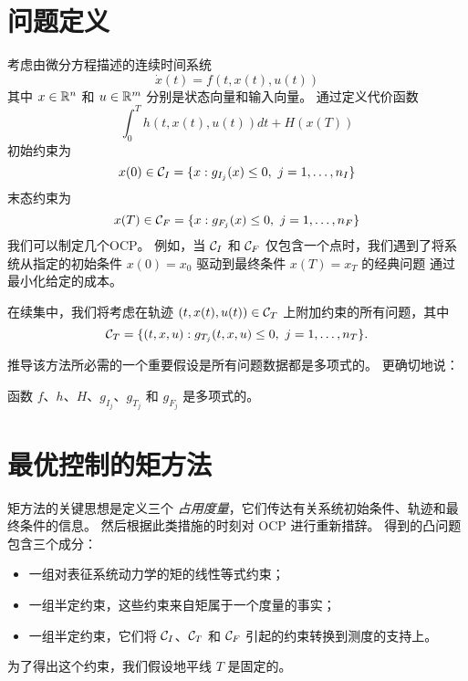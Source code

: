 \begin{translation}
\section{问题定义}
考虑由微分方程描述的连续时间系统
\begin{equation}\label{eq:dynamics}
\dot x(t) = f(t, x(t), u(t))
\end{equation}
其中 $x\in\mathbb{R}^n$ 和 $u\in\mathbb{R}^m$ 分别是状态向量和输入向量。
通过定义代价函数
\begin{equation}\label{eq:cost}
\int_0^T h(t, x(t), u(t)) dt + H(x(T))
\end{equation}
初始约束为
\begin{equation}\nonumber
x(0) \in {\cal{C}}_I=\{ x: g_{I_j}(x)\leq 0, ~ j=1,\dots,n_I \} 
\end{equation}
末态约束为
\begin{equation}\nonumber
x(T) \in {\cal{C}}_F=\{ x: g_{F_j}(x)\leq 0, ~ j=1,\dots,n_F \}
\end{equation}
我们可以制定几个OCP。 例如，当 ${\cal{C}}_I$ 和 ${\cal{C}}_F$ 仅包含一个点时，我们遇到了将系统从指定的初始条件 $x(0)=x_0$ 驱动到最终条件 $x(T)=x_T$ 的经典问题 通过最小化给定的成本。

在续集中，我们将考虑在轨迹 $(t, x(t), u(t)) \in {\cal{C}}_T$ 上附加约束的所有问题，其中
\begin{equation}\nonumber
{\cal{C}}_T=\{ (t,x,u): g_{T_j}(t,x,u)\leq 0, ~ j=1,\dots,n_T \}.
\end{equation}

推导该方法所必需的一个重要假设是所有问题数据都是多项式的。 更确切地说：
\begin{assumption}\label{as:poly}
  函数 $f$、$h$、$H$、$g_{I_j}$、$g_{T_j}$ 和 $g_{F_j}$ 是多项式的。
\end{assumption}

\section{最优控制的矩方法}
矩方法的关键思想是定义三个 \textit{占用度量}，它们传达有关系统初始条件、轨迹和最终条件的信息。
然后根据此类措施的时刻对 OCP 进行重新措辞。
得到的凸问题包含三个成分：
\begin{itemize}
\item 一组对表征系统动力学的矩的线性等式约束；
\item 一组半定约束，这些约束来自矩属于一个度量的事实；
\item 一组半定约束，它们将 ${\cal{C}}_I$、${\cal{C}}_T$ 和 ${\cal{C}}_F$ 引起的约束转换到测度的支持上。
\end{itemize}
为了得出这个约束，我们假设地平线 $T$ 是固定的。



\end{translation}
